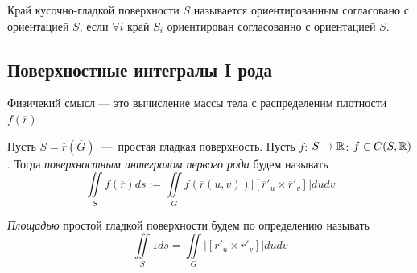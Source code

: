 \begin{definition}
    Край кусочно-гладкой поверхности $S$ называется ориентированным согласовано с ориентацией $S$, если $\forall i$ край $S_i$ ориентирован согласованно с ориентацией $S$.
\end{definition}

\subsection{Поверхностные интегралы I рода}
Физичекий смысл --- это вычисление массы тела с распределеним плотности $f(\overline{r})$ 
\begin{definition}
    Пусть $S = \overline{r}(\overline{G})$~---~простая гладкая поверхность. Пусть $f$: $S \rightarrow \mathbb{R}$: $f \in C(S, \mathbb{R})$. Тогда \textit{поверхностным интегралом первого рода} будем называть \[\iint\limits_S f(\overline{r})ds := \iint\limits_G f(\overline{r}(u, v))|[\overline{r}'_u \times \overline{r}'_v]|dudv\]
\end{definition}
\begin{definition}
    \textit{Площадью} простой гладкой поверхности будем по определению называть \[\iint\limits_S 1ds = \iint\limits_G |[\overline{r}'_u \times \overline{r}'_v]|dudv\]
\end{definition}
